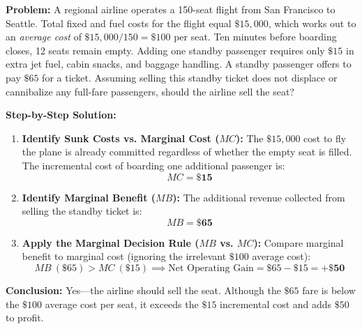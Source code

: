 \documentclass[11pt,letterpaper]{article}
\begin{document}
\begin{tcolorbox}[colback=CourseBlue!5!white,colframe=CourseBlue!80!black,title=\textbf{Work It Out: Pricing a Last-Minute Standby Airline Seat}]
\textbf{Problem:} A regional airline operates a 150-seat flight from San Francisco to Seattle. Total fixed and fuel costs for the flight equal $\$15{,}000$, which works out to an \emph{average cost} of $\$15{,}000 / 150 = \$100$ per seat. Ten minutes before boarding closes, 12 seats remain empty. Adding one standby passenger requires only $\$15$ in extra jet fuel, cabin snacks, and baggage handling. A standby passenger offers to pay $\$65$ for a ticket. Assuming selling this standby ticket does not displace or cannibalize any full-fare passengers, should the airline sell the seat?

\medskip
\noindent\textbf{Step-by-Step Solution:}
\begin{enumerate}
    \item \textbf{Identify Sunk Costs vs. Marginal Cost ($MC$):}
    The $\$15{,}000$ cost to fly the plane is already committed regardless of whether the empty seat is filled. The incremental cost of boarding one additional passenger is:
    \[
    MC = \mathbf{\$15}
    \]

    \item \textbf{Identify Marginal Benefit ($MB$):}
    The additional revenue collected from selling the standby ticket is:
    \[
    MB = \mathbf{\$65}
    \]

    \item \textbf{Apply the Marginal Decision Rule ($MB$ vs. $MC$):}
    Compare marginal benefit to marginal cost (ignoring the irrelevant $\$100$ average cost):
    \[
    MB\ (\$65) > MC\ (\$15) \implies \text{Net Operating Gain} = \$65 - \$15 = \mathbf{+\$50}
    \]
\end{enumerate}
\textbf{Conclusion:} Yes—the airline should sell the seat. Although the $\$65$ fare is below the $\$100$ average cost per seat, it exceeds the $\$15$ incremental cost and adds $\$50$ to profit.
\end{tcolorbox}
\end{document}
